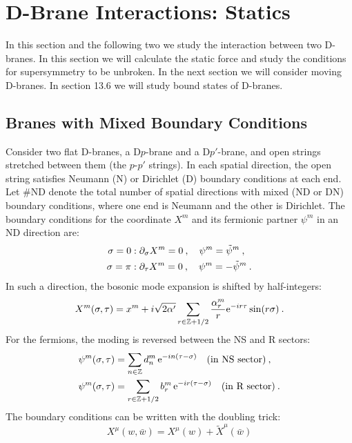 \section{D-Brane Interactions: Statics}

In this section and the following two we study the interaction between two D-branes. In this section we will calculate the static force and study the conditions for supersymmetry to be unbroken. In the next section we will consider moving D-branes. In section 13.6 we will study bound states of D-branes.

\subsection*{Branes with Mixed Boundary Conditions}

Consider two flat D-branes, a D$p$-brane and a D$p'$-brane, and open strings stretched between them (the $p$-$p'$ strings). In each spatial direction, the open string satisfies Neumann (N) or Dirichlet (D) boundary conditions at each end. Let $\#\mathrm{ND}$ denote the total number of spatial directions with mixed (ND or DN) boundary conditions, where one end is Neumann and the other is Dirichlet. The boundary conditions for the coordinate $X^m$ and its fermionic partner $\psi^m$ in an ND direction are:
\begin{align*}
	\sigma = 0 &: \partial_\sigma X^m = 0 \:, \quad \psi^m = \tilde{\psi}^m \:, \\
	\sigma = \pi &: \partial_\tau X^m = 0 \:, \quad \psi^m = -\tilde{\psi}^m \:.
\end{align*}
In such a direction, the bosonic mode expansion is shifted by half-integers:
\begin{equation}
	X^m(\sigma,\tau) = x^m + i\sqrt{2\alpha'}\sum_{r\in\mathbb{Z}+1/2}\frac{\alpha_r^m}{r}\mathrm{e}^{-i r\tau}\sin(r\sigma) \:. \label{13.4.1}
\end{equation}
For the fermions, the moding is reversed between the NS and R sectors:
\begin{align}
	\psi^m(\sigma,\tau) &= \sum_{n\in\mathbb{Z}}d_n^m\,\mathrm{e}^{-i n(\tau-\sigma)} \quad \text{(in NS sector)} \:, \label{13.4.2} \\
	\psi^m(\sigma,\tau) &= \sum_{r\in\mathbb{Z}+1/2}b_r^m\,\mathrm{e}^{-i r(\tau-\sigma)} \quad \text{(in R sector)} \:. \label{13.4.3}
\end{align}
The boundary conditions can be written with the doubling trick:
\begin{equation}
	X^\mu(w,\bar{w}) = X^\mu(w) + \tilde{X}^\mu(\bar{w}) \label{13.4.4}
\end{equation}
